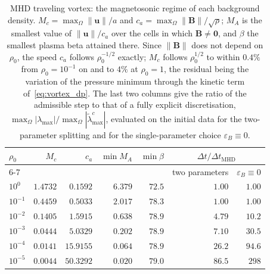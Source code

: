 \documentclass[a4paper,fleqn]{cas-sc}
\theoremstyle{remark}
\newcommand{\eps}{\varepsilon}
\newcommand{\epsB}{\eps_{B}}
\newcommand{\Bb}{\mathbf{B}}
\begin{document}
\begin{table}[pos=htbp]
\centering
\footnotesize
\caption{MHD traveling vortex: the magnetosonic regime of each background
density. $M_c=\max_\Omega\|\mathbf u\|/a$ and $c_a=\max_\Omega\|\Bb\|/\sqrt{\rho}$;
$M_A$ is the smallest value of $\|\mathbf u\|/c_a$ over the cells in which
$\Bb\neq\mathbf 0$, and $\beta$ the smallest plasma beta attained there. Since
$\|\Bb\|$ does not depend on $\rho_0$, the speed $c_a$ follows
$\rho_0^{-1/2}$ exactly; $M_c$ follows $\rho_0^{1/2}$ to within $0.4\%$ from
$\rho_0=10^{-1}$ on and to $4\%$ at $\rho_0=1$, the residual being the
variation of the pressure minimum through the kinetic term
of~\eqref{eq:vortex_dp}. The last two columns give the ratio of the admissible
step to that of a fully explicit discretisation,
$\max_\Omega|\lambda_{\max}|/\max_\Omega|\tilde\lambda^{c}_{\max}|$, evaluated on
the initial data for the two-parameter splitting and for the single-parameter
choice $\epsB\equiv0$.}
\label{tab:vortex_regimes}
\begin{tabular}{lrrrrrr}
\toprule
$\rho_0$ & $M_c$ & $c_a$ & $\min M_A$ & $\min\beta$ &
\multicolumn{2}{c}{$\Delta t/\Delta t_{\mathrm{MHD}}$} \\
\cmidrule(l){6-7}
 & & & & & two parameters & $\epsB\equiv0$ \\
\midrule
$10^{0}$  & $1.4732$ & $0.1592$ & $6.379$ & $72.5$ & $1.00$  & $1.00$ \\
$10^{-1}$ & $0.4459$ & $0.5033$ & $2.017$ & $78.3$ & $1.00$  & $1.00$ \\
$10^{-2}$ & $0.1405$ & $1.5915$ & $0.638$ & $78.9$ & $4.79$  & $10.2$ \\
$10^{-3}$ & $0.0444$ & $5.0329$ & $0.202$ & $78.9$ & $7.10$  & $30.5$ \\
$10^{-4}$ & $0.0141$ & $15.9155$ & $0.064$ & $78.9$ & $26.2$  & $94.6$ \\
$10^{-5}$ & $0.0044$ & $50.3292$ & $0.020$ & $79.0$ & $86.5$  & $298$ \\
\bottomrule
\end{tabular}
\end{table}
\end{document}
